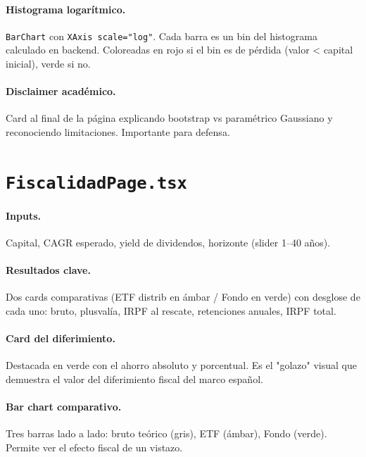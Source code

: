 \documentclass[11pt,a4paper]{book}
\begin{document}
\paragraph{Histograma logarítmico.} \texttt{BarChart} con \texttt{XAxis scale="log"}. Cada barra es un bin del histograma calculado en backend. Coloreadas en rojo si el bin es de pérdida (valor < capital inicial), verde si no.

\paragraph{Disclaimer académico.} Card al final de la página explicando bootstrap vs paramétrico Gaussiano y reconociendo limitaciones. Importante para defensa.

\section{\texttt{FiscalidadPage.tsx}}

\paragraph{Inputs.} Capital, CAGR esperado, yield de dividendos, horizonte (slider 1--40 años).

\paragraph{Resultados clave.} Dos cards comparativas (ETF distrib en ámbar / Fondo en verde) con desglose de cada uno: bruto, plusvalía, IRPF al rescate, retenciones anuales, IRPF total.

\paragraph{Card del diferimiento.} Destacada en verde con el ahorro absoluto y porcentual. Es el "golazo" visual que demuestra el valor del diferimiento fiscal del marco español.

\paragraph{Bar chart comparativo.} Tres barras lado a lado: bruto teórico (gris), ETF (ámbar), Fondo (verde). Permite ver el efecto fiscal de un vistazo.
\end{document}
